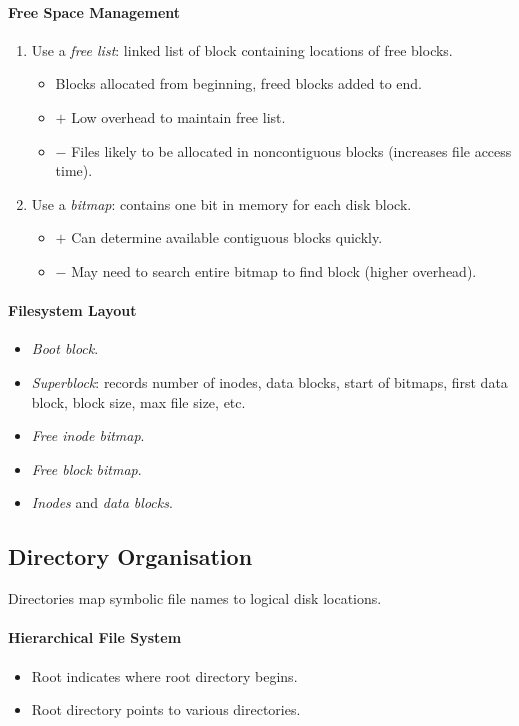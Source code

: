 \documentclass[twocolumn,english]{article}
\begin{document}
\paragraph{Free Space Management}
\begin{enumerate}
\item Use a \emph{free list}: linked list of block containing locations
of free blocks.
\begin{itemize}
\item Blocks allocated from beginning, freed blocks added to end.
\item $+$ Low overhead to maintain free list.
\item $-$ Files likely to be allocated in noncontiguous blocks (increases
file access time).
\end{itemize}
\item Use a \emph{bitmap}: contains one bit in memory for each disk block.
\begin{itemize}
\item $+$ Can determine available contiguous blocks quickly.
\item $-$ May need to search entire bitmap to find block (higher overhead).
\end{itemize}
\end{enumerate}

\paragraph{Filesystem Layout}
\begin{itemize}
\item \emph{Boot block}.
\item \emph{Superblock}: records number of inodes, data blocks, start of
bitmaps, first data block, block size, max file size, etc.
\item \emph{Free inode bitmap}.
\item \emph{Free block bitmap}.
\item \emph{Inodes} and \emph{data blocks}.
\end{itemize}

\subsection{Directory Organisation}

Directories map symbolic file names to logical disk locations.

\paragraph{Hierarchical File System}
\begin{itemize}
\item Root indicates where root directory begins.
\item Root directory points to various directories.
\end{itemize}
\end{document}
